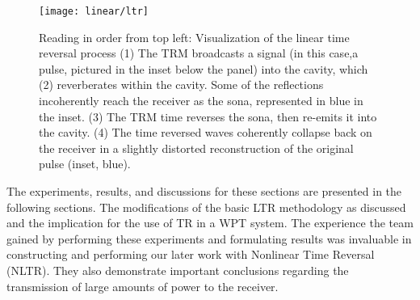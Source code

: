 \begin{figure}[]
\centering
\texttt{[image: linear/ltr]}
    \caption[Conceptual overview of linear time reversal]{Reading in order from top left: Visualization of the linear time reversal process (1) The TRM broadcasts a signal (in this case,a pulse, pictured in the inset below the panel) into the cavity, which (2) reverberates within the cavity. Some of the reflections incoherently reach the receiver as the sona, represented in blue in the inset. (3) The TRM time reverses the sona, then re-emits it into the cavity. (4) The time reversed waves coherently collapse back on the receiver in a slightly distorted reconstruction of the original pulse (inset, blue).}
    \label{fig:linear-ltr}
\end{figure}

The experiments, results, and discussions for these sections are presented in the following sections. The modifications of the basic LTR methodology as discussed and the implication for the use of TR in a WPT system. The experience the team gained by performing these experiments and formulating results was invaluable in constructing and performing our later work with Nonlinear Time Reversal (NLTR). They also demonstrate important conclusions regarding the transmission of large amounts of power to the receiver.
